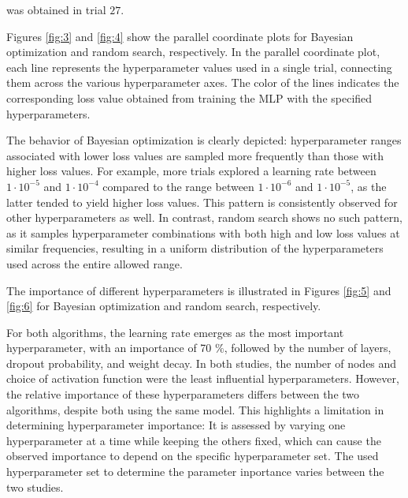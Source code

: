 
was obtained in trial $27$. 

Figures \ref{fig:3} and \ref{fig:4} show the parallel coordinate plots for Bayesian optimization and random search, respectively. In the parallel coordinate plot, each line represents the
hyperparameter values used in a single trial, connecting them across the various hyperparameter axes. The color of the lines indicates the corresponding loss value obtained from training the MLP with the specified hyperparameters.



The behavior of Bayesian optimization is clearly depicted: hyperparameter ranges associated with lower loss values are sampled more frequently than those with higher loss values. For example,
more trials explored a learning rate between $1 \cdot 10^{-5}$ and $1 \cdot 10^{-4}$ compared to the range between $1 \cdot 10^{-6}$ and $1 \cdot 10^{-5}$, as the latter tended to yield higher loss values.
This pattern is consistently observed for other hyperparameters as well. In contrast, random search shows no such pattern, as it samples hyperparameter combinations with both high and low loss values at similar
frequencies, resulting in a uniform distribution of the hyperparameters used across the entire allowed range.

The importance of different hyperparameters is illustrated in Figures \ref{fig:5} and \ref{fig:6} for Bayesian optimization and random search, respectively.


For both algorithms, the learning rate emerges as the most important hyperparameter, with an importance of 70 $\%$, followed by the number of layers, dropout probability, and weight decay.
In both studies, the number of nodes and choice of activation function were the least influential hyperparameters.
However, the relative importance of these hyperparameters differs between the two algorithms, despite both using the same model. This highlights a limitation in determining hyperparameter importance:
It is assessed by varying one hyperparameter at a time while keeping the others fixed, which can cause the observed importance to depend on the specific hyperparameter set. The used hyperparameter set 
to determine the parameter inportance varies between the two studies. \\

